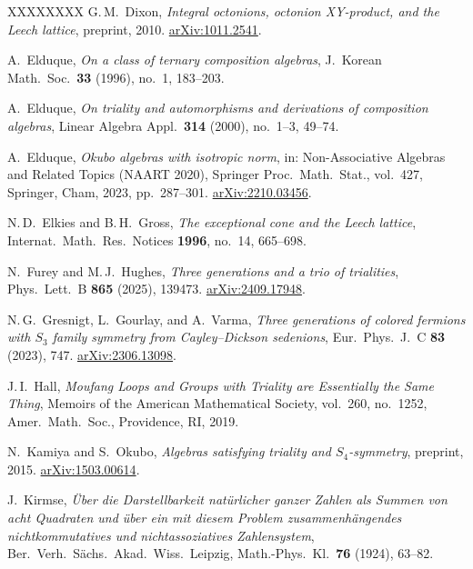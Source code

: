 \documentclass[twoside,english]{paper}
\numberwithin{equation}{section}
\numberwithin{figure}{section}
\theoremstyle{definition}
\theoremstyle{remark}
\begin{document}
\begin{thebibliography}{XXXXXXXX}
G.\,M.~Dixon,
\emph{Integral octonions, octonion XY-product, and the Leech lattice},
preprint, 2010.
\href{https://arxiv.org/abs/1011.2541}{arXiv:1011.2541}.

A.~Elduque,
\emph{On a class of ternary composition algebras},
J.~Korean Math.\ Soc.\ \textbf{33} (1996), no.~1, 183--203.

A.~Elduque,
\emph{On triality and automorphisms and derivations of composition
algebras},
Linear Algebra Appl.\ \textbf{314} (2000), no.~1--3, 49--74.

A.~Elduque,
\emph{Okubo algebras with isotropic norm},
in: Non-Associative Algebras and Related Topics (NAART 2020),
Springer Proc.\ Math.\ Stat., vol.~427, Springer, Cham, 2023,
pp.~287--301.
\href{https://arxiv.org/abs/2210.03456}{arXiv:2210.03456}.

N.\,D.~Elkies and B.\,H.~Gross,
\emph{The exceptional cone and the Leech lattice},
Internat.\ Math.\ Res.\ Notices \textbf{1996}, no.~14, 665--698.

N.~Furey and M.\,J.~Hughes,
\emph{Three generations and a trio of trialities},
Phys.\ Lett.\ B \textbf{865} (2025), 139473.
\href{https://arxiv.org/abs/2409.17948}{arXiv:2409.17948}.

N.\,G.~Gresnigt, L.~Gourlay, and A.~Varma,
\emph{Three generations of colored fermions with $S_3$ family
symmetry from Cayley--Dickson sedenions},
Eur.\ Phys.\ J.\ C \textbf{83} (2023), 747.
\href{https://arxiv.org/abs/2306.13098}{arXiv:2306.13098}.

J.\,I.~Hall,
\emph{Moufang Loops and Groups with Triality are Essentially the
Same Thing},
Memoirs of the American Mathematical Society, vol.~260, no.~1252,
Amer.\ Math.\ Soc., Providence, RI, 2019.

N.~Kamiya and S.~Okubo,
\emph{Algebras satisfying triality and\/ $S_4$-symmetry},
preprint, 2015.
\href{https://arxiv.org/abs/1503.00614}{arXiv:1503.00614}.

J.~Kirmse,
\emph{\"Uber die Darstellbarkeit nat\"urlicher ganzer Zahlen als Summen
von acht Quadraten und \"uber ein mit diesem Problem zusammenh\"angendes
nichtkommutatives und nichtassoziatives Zahlensystem},
Ber.\ Verh.\ S\"achs.\ Akad.\ Wiss.\ Leipzig, Math.-Phys.\ Kl.\
\textbf{76} (1924), 63--82.


\end{thebibliography}
\end{document}
